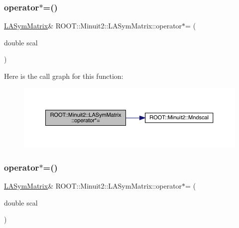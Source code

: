 \mbox{\label{classROOT_1_1Minuit2_1_1LASymMatrix_abb10e4e092df8072bf59de3a0880b336}} 
\subsubsection{\texorpdfstring{operator$\ast$=()}{operator*=()}\hspace{0.1cm}{\footnotesize\ttfamily [1/3]}}
{\footnotesize\ttfamily \mbox{\hyperlink{classROOT_1_1Minuit2_1_1LASymMatrix}{L\+A\+Sym\+Matrix}}\& R\+O\+O\+T\+::\+Minuit2\+::\+L\+A\+Sym\+Matrix\+::operator$\ast$= (\begin{DoxyParamCaption}\item[{double}]{scal }\end{DoxyParamCaption})\hspace{0.3cm}{\ttfamily [inline]}}

Here is the call graph for this function\+:
\nopagebreak
\begin{figure}[H]
\begin{center}
\leavevmode
\includegraphics[width=350pt]{d3/d72/classROOT_1_1Minuit2_1_1LASymMatrix_abb10e4e092df8072bf59de3a0880b336_cgraph}
\end{center}
\end{figure}
\mbox{\label{classROOT_1_1Minuit2_1_1LASymMatrix_abb10e4e092df8072bf59de3a0880b336}} 
\subsubsection{\texorpdfstring{operator$\ast$=()}{operator*=()}\hspace{0.1cm}{\footnotesize\ttfamily [2/3]}}
{\footnotesize\ttfamily \mbox{\hyperlink{classROOT_1_1Minuit2_1_1LASymMatrix}{L\+A\+Sym\+Matrix}}\& R\+O\+O\+T\+::\+Minuit2\+::\+L\+A\+Sym\+Matrix\+::operator$\ast$= (\begin{DoxyParamCaption}\item[{double}]{scal }\end{DoxyParamCaption})\hspace{0.3cm}{\ttfamily [inline]}}

